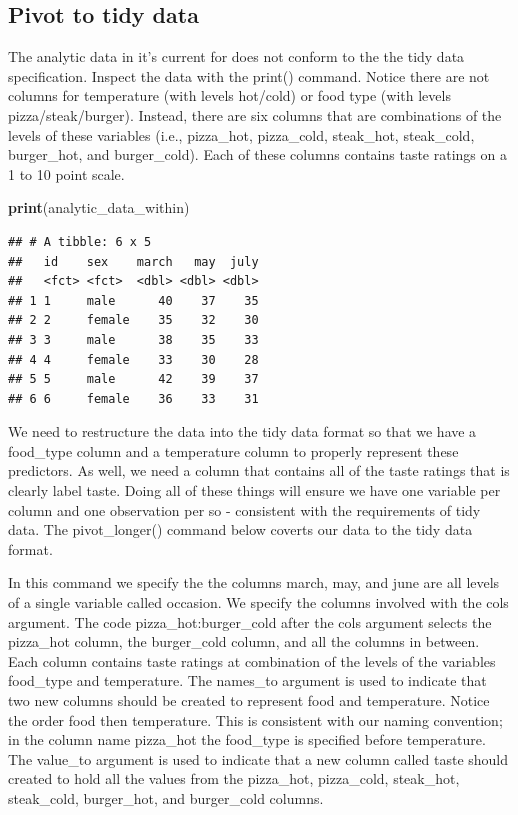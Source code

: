 \documentclass[
]{krantz}
\makeatletter
\newenvironment{Shaded}{\begin{snugshade}}{\end{snugshade}}
\newcommand{\KeywordTok}[1]{\textcolor[rgb]{0.27,0.27,0.27}{\textbf{#1}}}
\newcommand{\NormalTok}[1]{#1}
\newenvironment{kframe}{%
\medskip{}
\setlength{\fboxsep}{.8em}
 \def\at@end@of@kframe{}%
 \ifinner\ifhmode%
  \def\at@end@of@kframe{\end{minipage}}%
  \begin{minipage}{\columnwidth}%
 \fi\fi%
 \def\FrameCommand##1{\hskip\@totalleftmargin \hskip-\fboxsep
 \colorbox{shadecolor}{##1}\hskip-\fboxsep
     \hskip-\linewidth \hskip-\@totalleftmargin \hskip\columnwidth}%
 \MakeFramed {\advance\hsize-\width
   \@totalleftmargin\z@ \linewidth\hsize
   \@setminipage}}%
 {\par\unskip\endMakeFramed%
 \at@end@of@kframe}
\renewenvironment{Shaded}{\begin{kframe}}{\end{kframe}}
\makeatother
\begin{document}
\hypertarget{pivot-to-tidy-data-1}{%
\subsection{Pivot to tidy data}\label{pivot-to-tidy-data-1}}

The analytic data in it's current for does not conform to the the tidy data specification. Inspect the data with the print() command. Notice there are not columns for temperature (with levels hot/cold) or food type (with levels pizza/steak/burger). Instead, there are six columns that are combinations of the levels of these variables (i.e., pizza\_hot, pizza\_cold, steak\_hot, steak\_cold, burger\_hot, and burger\_cold). Each of these columns contains taste ratings on a 1 to 10 point scale.

\begin{Shaded}
\begin{Highlighting}[]
\KeywordTok{print}\NormalTok{(analytic_data_within)}
\end{Highlighting}
\end{Shaded}

\begin{verbatim}
## # A tibble: 6 x 5
##   id    sex    march   may  july
##   <fct> <fct>  <dbl> <dbl> <dbl>
## 1 1     male      40    37    35
## 2 2     female    35    32    30
## 3 3     male      38    35    33
## 4 4     female    33    30    28
## 5 5     male      42    39    37
## 6 6     female    36    33    31
\end{verbatim}

We need to restructure the data into the tidy data format so that we have a food\_type column and a temperature column to properly represent these predictors. As well, we need a column that contains all of the taste ratings that is clearly label taste. Doing all of these things will ensure we have one variable per column and one observation per so - consistent with the requirements of tidy data. The pivot\_longer() command below coverts our data to the tidy data format.

In this command we specify the the columns march, may, and june are all levels of a single variable called occasion. We specify the columns involved with the cols argument. The code pizza\_hot:burger\_cold after the cols argument selects the pizza\_hot column, the burger\_cold column, and all the columns in between. Each column contains taste ratings at combination of the levels of the variables food\_type and temperature. The names\_to argument is used to indicate that two new columns should be created to represent food and temperature. Notice the order food then temperature. This is consistent with our naming convention; in the column name pizza\_hot the food\_type is specified before temperature. The value\_to argument is used to indicate that a new column called taste should created to hold all the values from the pizza\_hot, pizza\_cold, steak\_hot, steak\_cold, burger\_hot, and burger\_cold columns.
\end{document}
